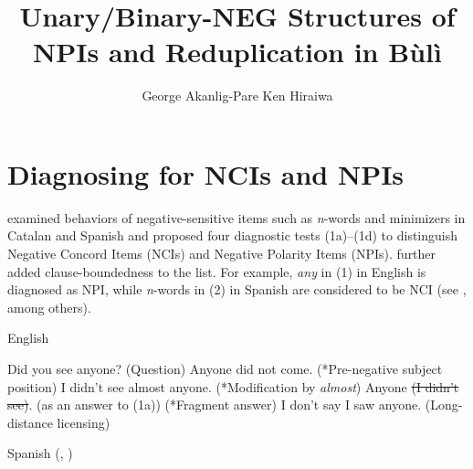 \documentclass[output=paper,colorlinks,citecolor=brown]{langscibook}
\title{Unary/Binary-NEG Structures of NPIs and Reduplication in Bùlì}
\author{%
George Akanlig-Pare\affiliation{University of Ghana, Legon}\lastand
Ken Hiraiwa\affiliation{Meiji Gakuin University}
}
\begin{document}
\maketitle 

\section{Diagnosing for NCIs and NPIs}

\cite{Vallduvi1994} examined behaviors of negative-sensitive items such as \textit{n}-words and minimizers in Catalan and Spanish and proposed four diagnostic tests (1a)--(1d) to distinguish Negative Concord Items (NCIs) and Negative Polarity Items (NPIs). \cite{Giannakidou2000} further added clause-boundedness to the list. For example, \textit{any} in (1) in English is diagnosed as NPI, while \textit{n}-words in (2) in Spanish are considered to be NCI (see \citealt{Ladusaw1979, HaegemanZanuttini1996, Haegeman1995, Watanabe2004, Giannakidou2006, GiannakidouZeijlstra2017}, among others).

\begin{exe}
\ex English
\begin{xlist}
    \ex Did you see anyone?           \hfill{(Question)}
    \ex *Anyone did not come.               \hfill{(*Pre-negative subject position)}
    \ex *I didn't see almost anyone.           \hfill{(*Modification by \textit{almost})}
    \ex *Anyone \sout{(I didn't see)}. (as an answer to (1a))      \hfill{(*Fragment answer)}
    \ex I don't say I saw anyone.            \hfill{(Long-distance licensing)}
\end{xlist}
\end{exe}

\begin{exe}

\ex Spanish (\citealt{Vallduvi1994}, \citealt{Penka2011})
\begin{xlist}
\end{xlist}
\end{exe}
\end{document}
